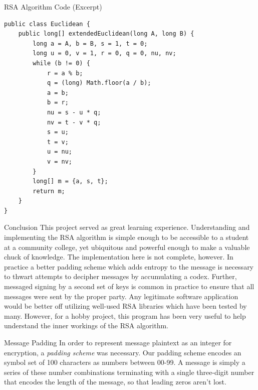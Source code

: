 \documentclass[landscape,fontscale=.4,paperwidth=48in,paperheight=36in]{baposter} %
\begin{document}
\begin{poster}
\begin{posterbox}[name=code,column=30,span=28,row=0]{RSA Algorithm Code (Excerpt)}
{\begin{verbatim}
public class Euclidean {
    public long[] extendedEuclidean(long A, long B) {
        long a = A, b = B, s = 1, t = 0;
        long u = 0, v = 1, r = 0, q = 0, nu, nv;
        while (b != 0) {
            r = a % b;
            q = (long) Math.floor(a / b);
            a = b;
            b = r;
            nu = s - u * q;
            nv = t - v * q;
            s = u;
            t = v;
            u = nu;
            v = nv;
        }
        long[] m = {a, s, t};
        return m;
    }
}
\end{verbatim}}

\end{posterbox}





\begin{posterbox}[name=conclusion, column=30, below=code, span=14]{Conclusion} 
This project served as great learning experience. Understanding and implementing the RSA algorithm is simple enough to be accessible to a student at a community college, yet ubiquitous and powerful enough to make a valuable chuck of knowledge. The implementation here is not complete, however. In practice a better padding scheme which adds entropy to the message is necessary to thwart attempts to decipher messages by accumulating a codex. Further, messaged signing by a second set of keys is common in practice to ensure that all messages were sent by the proper party. Any legitimate software application would be better off utilizing well-used RSA libraries which have been tested by many. However, for a hobby project, this program has been very useful to help understand the inner workings of the RSA algorithm.
\end{posterbox}



\begin{posterbox}[name=padding, column=44, below=code, span=14]{Message Padding}
In order to represent message plaintext as an integer for encryption, a \emph{padding scheme} was necessary. Our padding scheme encodes an symbol set of 100 characters as numbers between 00-99. A message is simply a series of these number combinations terminating with a single three-digit number that encodes the length of the message, so that leading zeros aren't lost.
\end{posterbox}




\end{poster}
\end{document}
